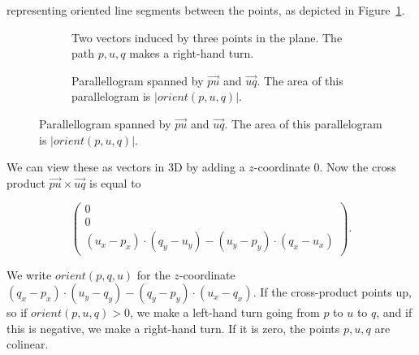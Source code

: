representing oriented line segments between the points, as depicted in
Figure~\ref{fig:orient1}.

\begin{figure}[ht]
    \begin{subfigure}{0.45\textwidth}
    \caption{Two vectors induced by three points in the plane. The path 
             $p, u, q$ makes a right-hand turn.}
    \label{fig:orient1}
    \end{subfigure}\hfill
    \begin{subfigure}{0.45\textwidth}
    \caption{Parallellogram spanned by $\vec{pu}$ and $\vec{uq}$. 
             The area of this parallelogram is $|orient(p, u, q)|$.}
    \label{fig:orient2}
    \end{subfigure}
\end{figure}

We can view these as vectors in 3D by adding a $z$-coordinate $0$. Now the
cross product $\vec{pu} \times \vec{uq}$ is equal to 

\[
    \begin{pmatrix}
        0 \\
        0 \\
        (u_x - p_x) \cdot (q_y - u_y) - (u_y - p_y) \cdot (q_x - u_x)
    \end{pmatrix}.
\]

We write $orient(p, q, u)$ for the $z$-coordinate
$(q_x - p_x) \cdot (u_y - q_y) - (q_y - p_y) \cdot (u_x - q_x)$. 
If the cross-product points up, so if $orient(p, u, q) > 0$, we make a left-hand 
turn going from $p$ to $u$ to $q$, and if this is negative, we make a right-hand
turn. If it is zero, the points $p, u, q$ are colinear. 

